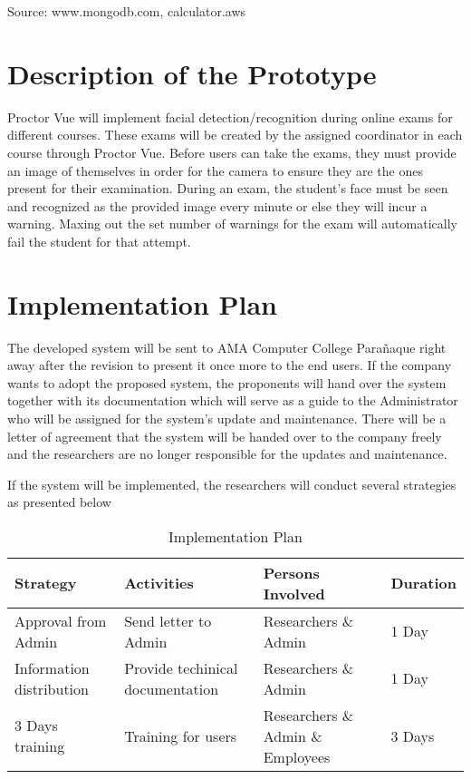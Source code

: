 Source: www.mongodb.com, calculator.aws

\section{Description of the Prototype}

Proctor Vue will implement facial detection/recognition during online exams for different courses.
These exams will be created by the assigned coordinator in each course through Proctor Vue.
Before users can take the exams, they must provide an image of themselves in order for the camera to ensure they are the ones present for their examination.
During an exam, the student's face must be seen and recognized as the provided image every minute or else they will incur a warning.
Maxing out the set number of warnings for the exam will automatically fail the student for that attempt.

\section{Implementation Plan}

The developed system will be sent to AMA Computer College Parañaque right away after the revision to present it once more to the end users.
If the company wants to adopt the proposed system, the proponents will hand over the system together with its documentation which will serve as a guide to the Administrator who will be assigned for the system’s update and maintenance.
There will be a letter of agreement that the system will be handed over to the company freely and the researchers are no longer responsible for the updates and maintenance.

If the system will be implemented, the researchers will conduct several strategies as presented below

\vspace{1cm}

\begin{table}[h!]
   \begin{center}
      \begin{tabular}{|m{10em}|m{8em}|m{10em}|m{4em}|}
         \hline
         \textbf{Strategy}        & \textbf{Activities}              & \textbf{Persons Involved}         & \textbf{Duration} \\
         \hline
         Approval from Admin      & Send letter to Admin             & Researchers \& Admin              & 1 Day             \\
         \hline
         Information distribution & Provide techinical documentation & Researchers \& Admin              & 1 Day             \\
         \hline
         3 Days training          & Training for users               & Researchers \& Admin \& Employees & 3 Days            \\
         \hline
      \end{tabular}
   \end{center}
   \caption{Implementation Plan}
\end{table}
